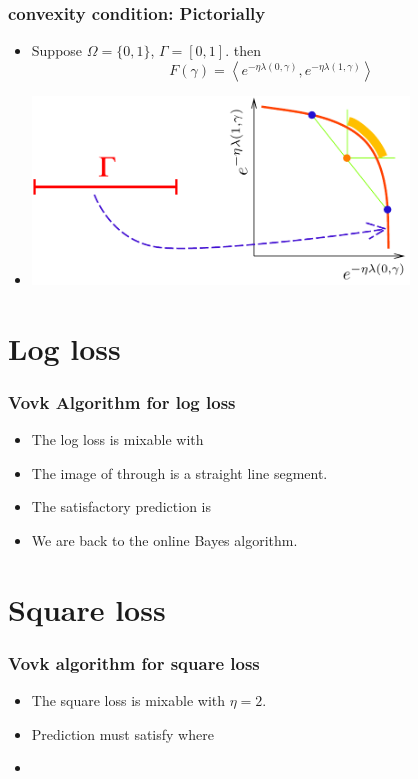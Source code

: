 \documentclass{beamer}
\begin{document}
\begin{frame}
\frametitle{convexity condition: Pictorially}
\begin{itemize}
\item
{} Suppose $\Omega=\{0,1\}$, $\Gamma = [0,1]$.
then
\[
F(\gamma) = \left\langle
  e^{-\eta \lambda(0,\gamma)},e^{-\eta \lambda(1,\gamma)}
\right\rangle
\]
\item
\begin{center}
\includegraphics[height=5cm]{figures/convex.pdf}
\end{center}
\end{itemize}
\end{frame}

\section{Log loss}

\begin{frame}
\frametitle{Vovk Algorithm for log loss}
\begin{itemize}
\item The log loss is mixable with 
\item The image of \R{$[0,1]$} through  is a straight line segment.
\item The  satisfactory prediction is 
\R{\[
\gamma = \frac{\sum_i \weight{i}{} \gamma_i}{\sum_i \weight{i}{}}
\]}
\item
We are back to the online Bayes algorithm.
\end{itemize}
\end{frame}

\section{Square loss}

\begin{frame}
\frametitle{Vovk algorithm for square loss}
\begin{itemize}
\item The square loss is mixable with $\eta=2$.
\item Prediction must satisfy
where
\item
{}
\end{itemize}
\end{frame}
\end{document}
